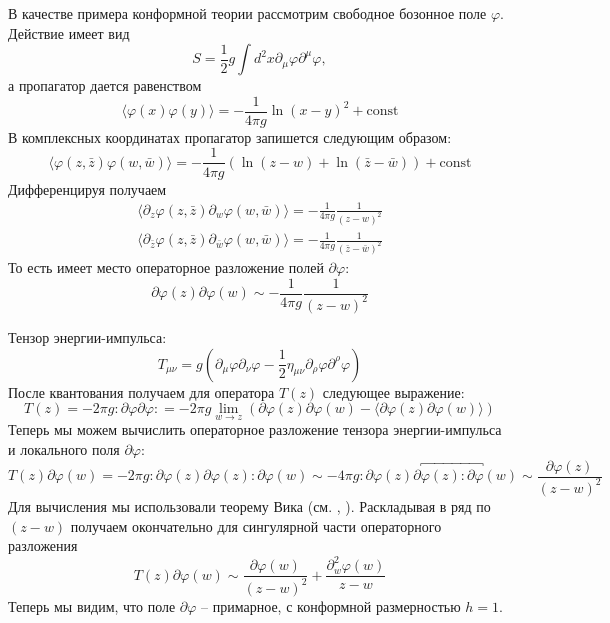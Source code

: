 \documentclass[a4paper,12pt]{article} \usepackage[utf8x]{inputenc} \usepackage[russian]{babel}
\theoremstyle{definition} \newtheorem{corollary}{Corollary}[theorem] \theoremstyle{definition}
\begin{document}
В качестве примера конформной теории рассмотрим свободное бозонное поле $\varphi$. Действие имеет
вид
\begin{equation}
  \label{eq:254} S=\frac{1}{2} g \int d^{2}x \partial_{\mu}\varphi \partial^{\mu}\varphi,
\end{equation} а пропагатор дается равенством
\begin{equation}
  \label{eq:255} \langle\varphi(x) \varphi(y)\rangle =-\frac{1}{4\pi g} \ln (x-y)^{2}+\text{const}
\end{equation} В комплексных координатах пропагатор запишется следующим образом:
\begin{equation}
  \label{eq:256} \langle \varphi(z,\bar z) \varphi(w,\bar w)\rangle =-\frac{1}{4\pi g} \left(
\ln(z-w) + \ln(\bar z -\bar w)\right) +\text{const}
\end{equation} Дифференцируя получаем
\begin{eqnarray}
  \label{eq:257} \langle\partial_{z} \varphi(z,\bar z) \partial_{w}\varphi(w,\bar w)\rangle
=-\frac{1}{4\pi g} \frac{1}{(z-w)^{2}}\\ \langle\partial_{\bar z} \varphi(z,\bar z) \partial_{\bar
w}\varphi(w,\bar w)\rangle =-\frac{1}{4\pi g} \frac{1}{(\bar z-\bar w)^{2}}
\end{eqnarray} То есть имеет место операторное разложение полей $\partial \varphi$:
\begin{equation}
  \label{eq:259}
  \partial \varphi(z) \partial \varphi(w) \sim -\frac{1}{4 \pi g} \frac{1}{(z-w)^{2}}
\end{equation}

Тензор энергии-импульса:
\begin{equation}
  \label{eq:258} T_{\mu\nu}=g \left(\partial_{\mu}\varphi \partial_{\nu} \varphi -\frac{1}{2}
\eta_{\mu\nu}\partial_{\rho}\varphi \partial^{\rho} \varphi \right)
\end{equation} После квантования получаем для оператора $T(z)$ следующее выражение:
\begin{equation}
  \label{eq:260} T(z) =-2\pi g :\partial \varphi \partial \varphi : =-2\pi g \lim_{w\to z}
\left(\partial \varphi(z) \partial \varphi(w) -\langle\partial \varphi(z) \partial
\varphi(w)\rangle\right)
\end{equation} Теперь мы можем вычислить операторное разложение тензора энергии-импульса и
локального поля $\partial \varphi$:
\begin{equation}
  \label{eq:261} T(z)\partial \varphi(w)=-2\pi g :\partial \varphi(z) \partial \varphi(z): \partial
\varphi(w) \sim -4\pi g:\partial \varphi(z) \partial \overbracket{ \varphi(z): \partial \varphi }
(w) \sim \frac{\partial \varphi (z)}{(z-w)^{2}}
\end{equation} Для вычисления мы использовали теорему Вика (см. \cite{vasiliev1998},
\cite{difrancesco1997cft}). Раскладывая в ряд по $(z-w)$ получаем окончательно для сингулярной части
операторного разложения
\begin{equation}
  \label{eq:262} T(z) \partial \varphi(w) \sim \frac{\partial \varphi(w) }{(z-w)^{2}}
+\frac{\partial_{w}^{2} \varphi(w)}{z-w}
\end{equation} Теперь мы видим, что поле $\partial \varphi$ -- примарное, с конформной размерностью
$h=1$.
\end{document}
